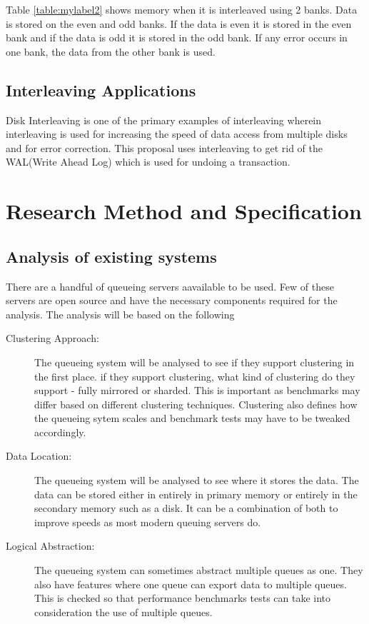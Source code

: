 \documentclass[12pt,a4paper]{article}
\begin{document}
Table \ref{table:mylabel2} shows memory when it is interleaved using 2 banks. Data is stored on the even and odd banks. If the data is even it is stored in the even bank and if the data is odd it is stored in the odd bank. If any error occurs in one bank, the data from the other bank is used. 

\subsection{Interleaving Applications}
Disk Interleaving is one of the primary examples of interleaving \citep{kim1986synchronized0} \citep{kim1991asynchronous} wherein interleaving is used for increasing the speed of data access from multiple disks and for error correction. This proposal uses interleaving to get rid of the WAL(Write Ahead Log) which is used for undoing a transaction\citep{mohan1992aries}.


\section{Research Method and Specification}



\subsection{Analysis of existing systems}

 There are a handful of queueing servers aavailable to be used. Few of these servers are open source and have the necessary components required for the analysis. The analysis will be based on the following
 
 \begin{description}
 	\item [Clustering Approach:] 
 	The queueing system will be analysed to see if they support clustering in the first place. if they support clustering, what kind of clustering do they support - fully mirrored or sharded. This is important as benchmarks may differ based on different clustering techniques. Clustering also defines how the queueing sytem scales \citep{cattell2011scalable} and benchmark tests may have to be tweaked accordingly.
 	\item [Data Location:]
 	The queueing system will be analysed to see where it stores the data. The data can be stored either in entirely in primary memory or entirely in the secondary memory such as a disk. It can be a combination of both to improve speeds as most modern queuing servers do.
 	\item [Logical Abstraction:]
 	The queueing system can sometimes abstract multiple queues as one. They also have features where one queue can export data to multiple queues. This is checked so that performance benchmarks tests can take into consideration the use of multiple queues. 
 	
 \end{description}
 
\end{document}

